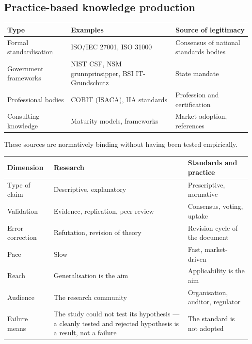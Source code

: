 \documentclass[11pt,a4paper,british,twoside=false,headings=small,chapterprefix=false,numbers=noenddot]{scrbook}
\newcommand{\src}[1]{{\scriptsize\color{uiagrey}#1}}
\begin{document}
\subsection{Practice-based knowledge production}
\begin{center}\small
\centering
  \footnotesize
  \begin{tabular}{@{}L{3.3cm}L{4.2cm}L{4.6cm}@{}}
    \toprule
    \textbf{Type} & \textbf{Examples} & \textbf{Source of legitimacy} \\
    \midrule
    Formal standardisation & ISO/IEC 27001, ISO 31000 & Consensus of national standards bodies \\
    Government frameworks & NIST CSF, NSM grunnprinsipper, BSI IT-Grundschutz & State mandate \\
    Professional bodies & COBIT (ISACA), IIA standards & Profession and certification \\
    Consulting knowledge & Maturity models, frameworks & Market adoption, references \\
    \bottomrule
  \end{tabular}
  \par
  \raggedright
  \src{These sources are normatively binding without having been tested empirically.}
\end{center}

\begin{center}\small
\centering
  \footnotesize
  \begin{tabular}{@{}L{3.1cm}L{4.4cm}L{4.4cm}@{}}
    \toprule
    \textbf{Dimension} & \textbf{Research} & \textbf{Standards and practice} \\
    \midrule
    Type of claim & Descriptive, explanatory & Prescriptive, normative \\
    Validation & Evidence, replication, peer review & Consensus, voting, uptake \\
    Error correction & Refutation, revision of theory & Revision cycle of the document \\
    Pace & Slow & Fast, market-driven \\
    Reach & Generalisation is the aim & Applicability is the aim \\
    Audience & The research community & Organisation, auditor, regulator \\
    Failure means & The study could not test its hypothesis --- a cleanly tested and rejected hypothesis is a result, not a failure & The standard is not adopted \\
    \bottomrule
  \end{tabular}
\end{center}
\end{document}
